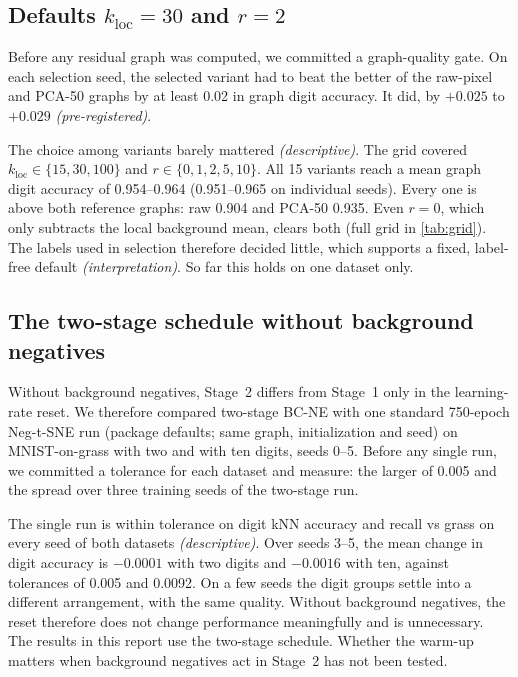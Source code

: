 \documentclass[10pt]{article}
\newcommand{\methodname}{BC-NE}
\newcommand{\cpre}{\textit{\small (pre-registered)}}
\newcommand{\cdesc}{\textit{\small (descriptive)}}
\newcommand{\cinterp}{\textit{\small (interpretation)}}
\newcommand{\kloc}{k_{\mathrm{loc}}}
\begin{document}
\subsection{Defaults $\kloc = 30$ and $r = 2$}
\label{sec:dec-defaults}

Before any residual graph was computed, we committed a graph-quality gate. On each selection seed, the selected variant had to beat the better of the raw-pixel and PCA-50 graphs by at least 0.02 in graph digit accuracy. It did, by $+0.025$ to $+0.029$ \cpre.

The choice among variants barely mattered \cdesc. The grid covered $\kloc \in \{15,30,100\}$ and $r \in \{0,1,2,5,10\}$. All 15 variants reach a mean graph digit accuracy of 0.954--0.964 (0.951--0.965 on individual seeds). Every one is above both reference graphs: raw 0.904 and PCA-50 0.935. Even $r = 0$, which only subtracts the local background mean, clears both (full grid in \cref{tab:grid}). The labels used in selection therefore decided little, which supports a fixed, label-free default \cinterp. So far this holds on one dataset only.

\subsection{The two-stage schedule without background negatives}
\label{sec:dec-schedule}

Without background negatives, Stage~2 differs from Stage~1 only in the learning-rate reset. We therefore compared two-stage \methodname{} with one standard 750-epoch Neg-t-SNE run (package defaults; same graph, initialization and seed) on MNIST-on-grass with two and with ten digits, seeds 0--5. Before any single run, we committed a tolerance for each dataset and measure: the larger of 0.005 and the spread over three training seeds of the two-stage run.

The single run is within tolerance on digit kNN accuracy and recall vs grass on every seed of both datasets \cdesc. Over seeds 3--5, the mean change in digit accuracy is $-0.0001$ with two digits and $-0.0016$ with ten, against tolerances of 0.005 and 0.0092. On a few seeds the digit groups settle into a different arrangement, with the same quality. Without background negatives, the reset therefore does not change performance meaningfully and is unnecessary. The results in this report use the two-stage schedule. Whether the warm-up matters when background negatives act in Stage~2 has not been tested.
\end{document}
